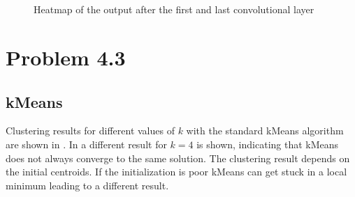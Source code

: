 \documentclass[12pt,a4paper]{scrartcl}
\begin{document}
	\begin{figure}[H]
		\centering	
		\\
		 \\
		\caption{Heatmap of the output after the first and last convolutional layer}
		\label{fig:ex4_2_features}
	\end{figure}
	
	\section*{Problem 4.3}
	
	\subsection*{kMeans}
	
	Clustering results for different values of $k$ with the standard kMeans algorithm are shown in . In  a different result for $k=4$ is shown, indicating that kMeans does not always converge to the same solution. The clustering result depends on the initial centroids. If the initialization is poor kMeans can get stuck in a local minimum leading to a different result.
	
\end{document}
